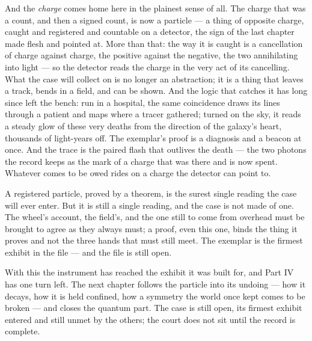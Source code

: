 And the \emph{charge} comes home here in the plainest sense of all. The charge that was a count, and then a
signed count, is now a particle --- a thing of opposite charge, caught and registered and countable on a
detector, the sign of the last chapter made flesh and pointed at. More than that: the way it is caught is a
cancellation of charge against charge, the positive against the negative, the two annihilating into light --- so
the detector reads the charge in the very act of its cancelling. What the case will collect on is no longer an
abstraction; it is a thing that leaves a track, bends in a field, and can be shown. And the logic that catches
it has long since left the bench: run in a hospital, the same coincidence draws its lines through a patient and
maps where a tracer gathered; turned on the sky, it reads a steady glow of these very deaths from the direction
of the galaxy's heart, thousands of light-years off. The exemplar's proof is a diagnosis and a beacon at once. And the trace is the paired
flash that outlives the death --- the two photons the record keeps as the mark of a charge that was there and is
now spent. Whatever comes to be owed rides on a charge the detector can point to.

A registered particle, proved by a theorem, is the surest single reading the case will ever enter. But it is
still a single reading, and the case is not made of one. The wheel's account, the field's, and the one still to
come from overhead must be brought to agree as they always must; a proof, even this one, binds the thing it
proves and not the three hands that must still meet. The exemplar is the firmest exhibit in the file --- and the
file is still open.

With this the instrument has reached the exhibit it was built for, and Part IV has one turn left. The next
chapter follows the particle into its undoing --- how it decays, how it is held confined, how a symmetry the
world once kept comes to be broken --- and closes the quantum part. The case is still open, its firmest exhibit
entered and still unmet by the others; the court does not sit until the record is complete.
